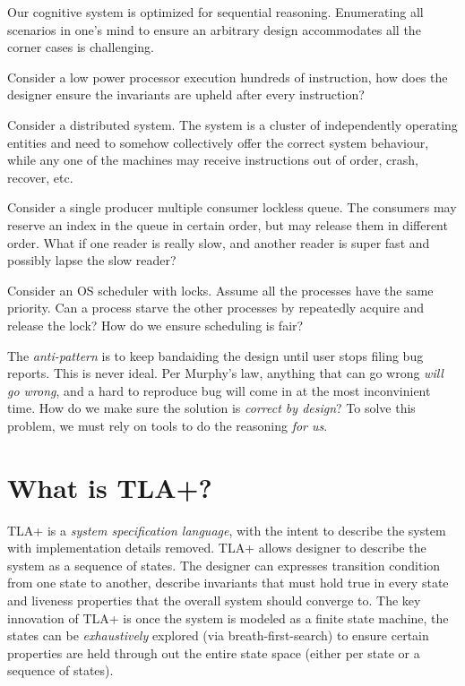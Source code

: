 Our cognitive system is optimized for sequential reasoning. Enumerating all
scenarios in one's mind to ensure an arbitrary design accommodates all the
corner cases is challenging.\newline

Consider a low power processor execution hundreds of instruction, how does the 
designer ensure the invariants are upheld after every instruction?\newline

Consider a distributed system. The system is a cluster of independently
operating entities and need to somehow collectively offer the correct system
behaviour, while any one of the machines may receive instructions out of order,
crash, recover, etc. \newline

Consider a single producer multiple consumer lockless queue. The consumers may 
reserve an index in the queue in certain order, but may release them in different order. 
What if one reader is really slow, and another reader is super fast and possibly 
lapse the slow reader? \newline

Consider an OS scheduler with locks. Assume all the processes have the same
priority. Can a process starve the other processes by repeatedly acquire and
release the lock? How do we ensure scheduling is fair?\newline


The \textit{anti-pattern} is to keep bandaiding the design until user stops
filing bug reports. This is never ideal. Per Murphy's law, anything that can go
wrong \textit{will go wrong}, and a hard to reproduce bug will come in at the
most inconvinient time. How do we make sure the solution is \textit{correct by
design}? To solve this problem, we must rely on tools to do the reasoning
\textit{for us}.

\section{What is TLA+?}

TLA+ is a \textit{system specification language}, with the intent to describe
the system with implementation details removed. TLA+ allows designer to describe
the system as a sequence of states. The designer can expresses transition
condition from one state to another, describe invariants that must hold true in
every state and liveness properties that the overall system should converge to.
The key innovation of TLA+ is once the system is modeled as a finite state
machine, the states can be \textit{exhaustively} explored (via
breath-first-search) to ensure certain properties are held through out the
entire state space (either per state or a sequence of states).\newline

